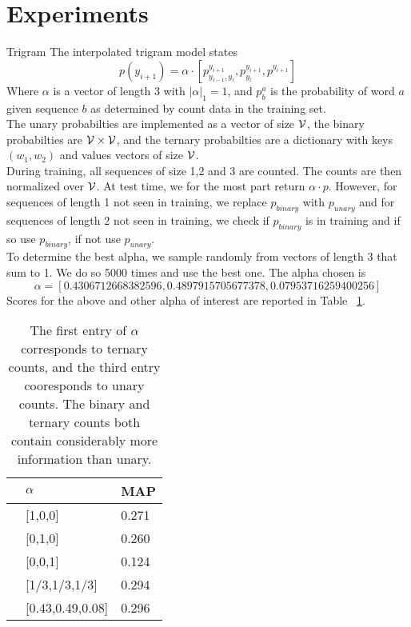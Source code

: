 \documentclass[11pt]{article}
\begin{document}
\section{Experiments}

\begin{subsection}{Trigram}
The interpolated trigram model states 
$$ p(y_{i+1}) = \alpha \cdot [p^{y_{i+1}}_{y_{i-1},y_{i}}, p^{y_{i+1}}_{y_{i}}, p^{y_{i+1}}]$$
Where $\alpha$ is a vector of length 3 with $|\alpha|_1 = 1$, and $p^a_{b}$ is the probability of word $a$ given sequence $b$ as determined by count data in the training set.\\
The unary probabilties are implemented as a vector of size $\mathcal{V}$, the binary probabilties are $\mathcal{V} \times \mathcal{V}$, and the ternary probabilties are a dictionary with keys $(w_1,w_2)$ and values vectors of size $\mathcal{V}$.\\
During training, all sequences of size 1,2 and 3 are counted. The counts are then normalized over $\mathcal{V}$. At test time, we for the most part return $\alpha \cdot p$. However, for sequences of length 1 not seen in training, we replace $p_{binary}$ with $p_{unary}$ and for sequences of length 2 not seen in training, we check if $p_{binary}$ is in training and if so use $p_{binary}$, if not use $p_{unary}$.\\
To determine the best alpha, we sample randomly from vectors of length 3 that sum to 1. We do so 5000 times and use the best one. The alpha chosen is 
$$ \alpha = [0.4306712668382596, 0.4897915705677378, 0.07953716259400256] $$
Scores for the above and other alpha of interest are reported in Table ~\ref{tab:interp}.
\begin{table}
  \begin{center}
    \begin{tabular}{@{}lll@{}}
      \toprule
      & $\alpha$ & MAP\\
      \midrule
      & [1,0,0] & 0.271 \\
      & [0,1,0] & 0.260 \\
      & [0,0,1] & 0.124 \\
      & [1/3,1/3,1/3] & 0.294 \\
      & [0.43,0.49,0.08] & 0.296\\
      \bottomrule
    \end{tabular}
  \end{center}
  \caption{\label{tab:interp} The first entry of $\alpha$ corresponds to ternary counts, and the third entry cooresponds to unary counts. The binary and ternary counts both contain considerably more information than unary.}
 \end{table}


\end{subsection}
\end{document}
